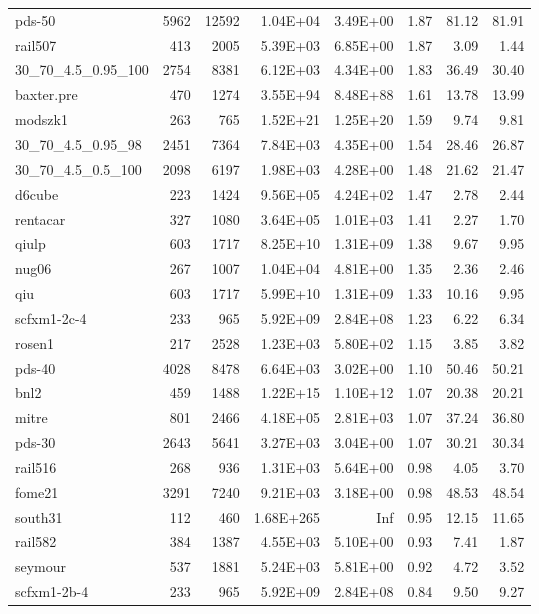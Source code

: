 \documentclass[10pt]{article}
\begin{document}
\begin{longtable}{|l|r|r|r|r|r|r|r|}
pds-50	&	5962	&	12592	&	1.04E+04	&	3.49E+00	&	1.87	&	81.12	&	81.91	\\
rail507	&	413	&	2005	&	5.39E+03	&	6.85E+00	&	1.87	&	3.09	&	1.44	\\
30\_70\_4.5\_0.95\_100	&	2754	&	8381	&	6.12E+03	&	4.34E+00	&	1.83	&	36.49	&	30.40	\\
baxter.pre	&	470	&	1274	&	3.55E+94	&	8.48E+88	&	1.61	&	13.78	&	13.99	\\
modszk1	&	263	&	765	&	1.52E+21	&	1.25E+20	&	1.59	&	9.74	&	9.81	\\
30\_70\_4.5\_0.95\_98	&	2451	&	7364	&	7.84E+03	&	4.35E+00	&	1.54	&	28.46	&	26.87	\\
30\_70\_4.5\_0.5\_100	&	2098	&	6197	&	1.98E+03	&	4.28E+00	&	1.48	&	21.62	&	21.47	\\
d6cube	&	223	&	1424	&	9.56E+05	&	4.24E+02	&	1.47	&	2.78	&	2.44	\\
rentacar	&	327	&	1080	&	3.64E+05	&	1.01E+03	&	1.41	&	2.27	&	1.70	\\
qiulp	&	603	&	1717	&	8.25E+10	&	1.31E+09	&	1.38	&	9.67	&	9.95	\\
nug06	&	267	&	1007	&	1.04E+04	&	4.81E+00	&	1.35	&	2.36	&	2.46	\\
qiu	&	603	&	1717	&	5.99E+10	&	1.31E+09	&	1.33	&	10.16	&	9.95	\\
scfxm1-2c-4	&	233	&	965	&	5.92E+09	&	2.84E+08	&	1.23	&	6.22	&	6.34	\\
rosen1	&	217	&	2528	&	1.23E+03	&	5.80E+02	&	1.15	&	3.85	&	3.82	\\
pds-40	&	4028	&	8478	&	6.64E+03	&	3.02E+00	&	1.10	&	50.46	&	50.21	\\
bnl2	&	459	&	1488	&	1.22E+15	&	1.10E+12	&	1.07	&	20.38	&	20.21	\\
mitre	&	801	&	2466	&	4.18E+05	&	2.81E+03	&	1.07	&	37.24	&	36.80	\\
pds-30	&	2643	&	5641	&	3.27E+03	&	3.04E+00	&	1.07	&	30.21	&	30.34	\\
rail516	&	268	&	936	&	1.31E+03	&	5.64E+00	&	0.98	&	4.05	&	3.70	\\
fome21	&	3291	&	7240	&	9.21E+03	&	3.18E+00	&	0.98	&	48.53	&	48.54	\\
south31	&	112	&	460	&	1.68E+265	&	Inf	&	0.95	&	12.15	&	11.65	\\
rail582	&	384	&	1387	&	4.55E+03	&	5.10E+00	&	0.93	&	7.41	&	1.87	\\
seymour	&	537	&	1881	&	5.24E+03	&	5.81E+00	&	0.92	&	4.72	&	3.52	\\
scfxm1-2b-4	&	233	&	965	&	5.92E+09	&	2.84E+08	&	0.84	&	9.50	&	9.27	\\

\end{longtable}
\end{document}
